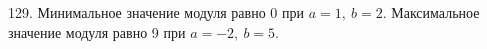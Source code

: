 129. Минимальное значение модуля равно 0 при $a=1,\ b=2.$ Максимальное значение модуля равно 9 при $a=-2,\ b=5.$\\
